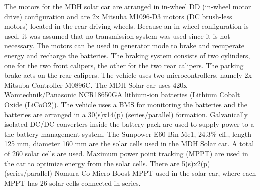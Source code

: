 The motors for the MDH solar car are arranged in in-wheel DD (in-wheel motor drive) configuration and are 2x Mitsuba M1096-D3 motors (DC brush-less motors) located in the rear driving wheels\:\cite{mdhsolarteamBillMaterials}. Because an in-wheel configuration is used, it was assumed that no transmission system was used since it is not necessary\:\cite{khajepourElectricHybridVehicles2014}. The motors can be used in generator mode to brake and recuperate energy and recharge the batteries\:\cite{mdhsolarteamBreaksystem}. The braking system consists of two cylinders, one for the two front calipers, the other for the two rear calipers\:\cite{mdhsolarteamBreaksystem}. The parking brake acts on the rear calipers\:\cite{mdhsolarteamBreaksystem}.
The vehicle uses two microcontrollers, namely 2x Mitsuba Controller M0896C\:\cite{mdhsolarteamBillMaterials}.
The MDH Solar car uses 420x Wamtechnik/Panasonic NCR18650GA lithium-ion batteries (Lithium Cobalt Oxide (LiCoO2))\:\cite{mdhsolarteamBillMaterials}\cite{panasonicLithiumIonBatteries2007}\cite{A4EnergyStorage2017}. The vehicle uses a BMS for monitoring the batteries and the batteries are arranged in a 30(s)x14(p) (series/parallel) formation\:\cite{mdhsolarteamBillMaterials}\cite{A4EnergyStorage2017}.
Galvanically isolated DC/DC converters inside the battery pack are used to supply power to a the battery management system\:\cite{mdhsolarteamA2ElectricalSystem2017}.
The Sunpower E60 Bin Me1, 24.3\% eff., length 125 mm, diameter 160 mm are the solar cells used in the MDH Solar car\:\cite{mdhsolarteamDeclarationRegulation2017}. A total of 260 solar cells are used\:\cite{mdhsolarteamBillMaterials}.
Maximum power point tracking (MPPT) are used in the car to optimize energy from the solar cells\:\cite{mdhsolarteamBillMaterials}. There are 5(s)x2(p) (series/parallel) Nomura Co Micro Boost MPPT used in the solar car, where each MPPT has 26 solar cells connected in series\:\cite{mdhsolarteamBillMaterials}.


